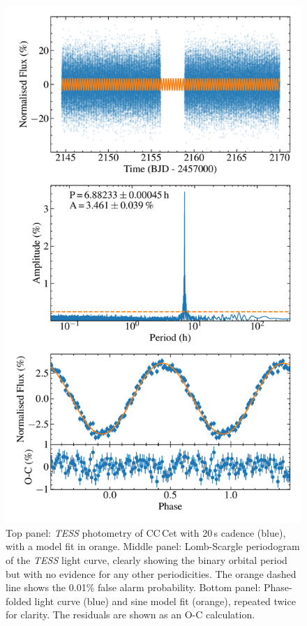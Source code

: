 \documentclass[fleqn,usenatbib]{mnras}
\begin{document}
\begin{figure}
    \centering
    \includegraphics[width=\columnwidth]{cc_cet_tess_20s.pdf}
    \caption{Top panel: \textit{TESS} photometry of CC\,Cet with 20\,s cadence (blue), with a model fit in orange. Middle panel: Lomb-Scargle periodogram of the \textit{TESS} light curve, clearly showing the binary orbital period but with no evidence for any other periodicities. The orange dashed line shows the 0.01\% false alarm probability. Bottom panel: Phase-folded light curve (blue) and sine model fit (orange), repeated twice for clarity. The residuals are shown as an O-C calculation.}  
    \label{fig:tess}
\end{figure}
\end{document}
